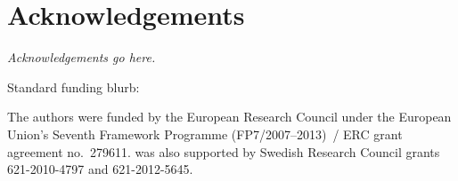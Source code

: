 \section*{Acknowledgements}

\emph{Acknowledgements go here.}


Standard funding blurb:


The authors were funded by the
European Research Council under the European Union's Seventh Framework
Programme \mbox{(FP7/2007--2013) /} ERC grant agreement no.~279611.
\TheauthorJN 
was also supported by
Swedish Research Council grants 
\mbox{621-2010-4797}
and
\mbox{621-2012-5645}.

